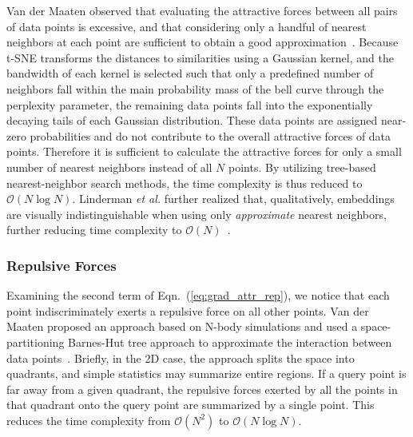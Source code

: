 \documentclass[letter]{article}
\begin{document}
Van der Maaten observed that evaluating the attractive forces between all pairs
of data points is excessive, and that considering only a handful of nearest
neighbors at each point are sufficient to obtain a good
approximation~\cite{van2014accelerating}.  Because t-SNE transforms the distances to
similarities using a Gaussian kernel, and the bandwidth of each kernel is
selected such that only a predefined number of neighbors fall within the main
probability mass of the bell curve through the perplexity parameter, the
remaining data points fall into the exponentially decaying tails of each
Gaussian distribution.  These data points are assigned near-zero probabilities
and do not contribute to the overall attractive forces of data points.
Therefore it is sufficient to calculate the attractive forces for only a small
number of nearest neighbors instead of all $N$ points. By utilizing tree-based
nearest-neighbor search methods, the time complexity is thus reduced to
$\mathcal{O}(N \log N)$. Linderman \textit{et al.} further realized that,
qualitatively, embeddings are visually indistinguishable when using only
\textit{approximate} nearest neighbors, further reducing time complexity to
$\mathcal{O}(N)$~\cite{linderman2019fast}.

\subsubsection*{Repulsive Forces}

Examining the second term of Eqn.~(\ref{eq:grad_attr_rep}), we notice that each
point indiscriminately exerts a repulsive force on all other points. Van der
Maaten proposed an approach based on N-body simulations and used a
space-partitioning Barnes-Hut tree approach to approximate the interaction
between data points~\cite{van2014accelerating}. Briefly, in the 2D case, the
approach splits the space into quadrants, and simple statistics may summarize entire regions.  If a query point is far away from a given quadrant, the
repulsive forces exerted by all the points in that quadrant onto the query point
are summarized by a single point. This reduces the time complexity from
$\mathcal{O}(N^2)$ to $\mathcal{O}(N \log N)$.
\end{document}
